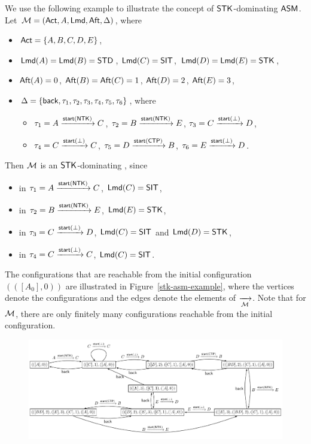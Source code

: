 \begin{example}
 We  use the following example to illustrate the concept of $\mathsf{STK}$-dominating $\textsf{ASM}$.
		Let ${\mathcal{M} }=({\sf Act},A,{\sf Lmd},{\sf Aft},\Delta)$, where 
		\begin{itemize}
			\item ${\sf Act} = \{A, B, C, D, E\}$, 
			\item ${\sf Lmd}(A)={\sf Lmd}(B)={\sf STD}$, ${\sf Lmd}(C) = {\sf SIT}$, ${\sf Lmd}(D) = {\sf Lmd}(E) = {\sf STK}$, 
			\item ${\sf Aft}(A) = 0$, ${\sf Aft}(B) = {\sf Aft}(C) = 1$, ${\sf Aft}(D) = 2$, ${\sf Aft}(E) = 3$, 
			\item $\Delta = \{{\mathsf{back} },\tau_1, \tau_2, \tau_3, \tau_4, \tau_5, \tau_6\}$, where 
			\begin{itemize}
				\item 	$\tau_1 = A \xrightarrow{{\mathsf{start} }({\sf NTK})} C$,
				$\tau_2 = B \xrightarrow{{\mathsf{start} }({\sf NTK})} E$,
				$\tau_3 = C \xrightarrow{{\mathsf{start} }(\bot)} D$,
				\item		$\tau_4 = C \xrightarrow{{\mathsf{start} }(\bot)} C$,
				$\tau_5 = D \xrightarrow{{\mathsf{start} }({\sf CTP})} B$,
				$\tau_6 = E \xrightarrow{{\mathsf{start} }(\bot)} D$. 
			\end{itemize}
		\end{itemize}
		Then ${\mathcal{M} }$ is an $\mathsf{STK}$-dominating {\AMASS}, since
		\begin{itemize}
			\item in $\tau_1 = A \xrightarrow{{\mathsf{start} }({\sf NTK})} C$, ${\sf Lmd}(C) = {\sf SIT}$,  
			\item in $\tau_2 = B \xrightarrow{{\mathsf{start} }({\sf NTK})} E$, ${\sf Lmd}(E) = {\sf STK}$, 
			\item in $\tau_3 = C \xrightarrow{{\mathsf{start} }(\bot)} D$, ${\sf Lmd}(C) = {\sf SIT}$ and ${\sf Lmd}(D) = {\sf STK}$, 
			\item in $\tau_4 = C \xrightarrow{{\mathsf{start} }(\bot)} C$, ${\sf Lmd}(C) = {\sf SIT}$. 
		\end{itemize}
		The configurations that are reachable from the initial configuration $(([A_0], 0))$ are illustrated in Figure~\ref{stk-asm-example}, where the vertices denote the configurations and the edges denote the elements of $\xrightarrow[{\mathcal{M} }]{}$. 
		Note that for ${\mathcal{M} }$, there are only finitely many configurations reachable from the initial configuration.  
\begin{figure}[htbp]
			\centering
			\includegraphics[scale = 0.65]{stk-asm-example.pdf}

\end{figure}
\end{example}
